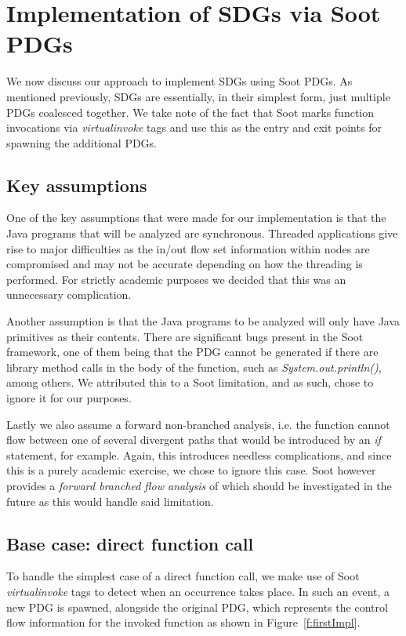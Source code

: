 \documentclass[authoryear,preprint]{sigplanconf}
\begin{document}
\section{Implementation of SDGs via Soot PDGs}

We now discuss our approach to implement SDGs using Soot PDGs. As mentioned previously, SDGs are essentially, in their simplest form, just multiple PDGs coalesced together. We take note of the fact that Soot marks function invocations via \textit{virtualinvoke} tags and use this as the entry and exit points for spawning the additional PDGs.

\subsection{Key assumptions}

One of the key assumptions that were made for our implementation is that the Java programs that will be analyzed are synchronous. Threaded applications give rise to major difficulties as the in/out flow set information within nodes are compromised and may not be accurate depending on how the threading is performed. For strictly academic purposes we decided that this was an unnecessary complication.

Another assumption is that the Java programs to be analyzed will only have Java primitives as their contents. There are significant bugs present in the Soot framework, one of them being that the PDG cannot be generated if there are library method calls in the body of the function, such as \textit{System.out.println()}, among others. We attributed this to a Soot limitation, and as such, chose to ignore it for our purposes.

Lastly we also assume a forward non-branched analysis, i.e. the function cannot flow between one of several divergent paths that would be introduced by an \textit{if} statement, for example. Again, this introduces needless complications, and since this is a purely academic exercise, we chose to ignore this case. Soot however provides a \textit{forward branched flow analysis} of which should be investigated in the future as this would handle said limitation.

\subsection{Base case: direct function call}

To handle the simplest case of a direct function call, we make use of Soot \textit{virtualinvoke} tags to detect when an occurrence takes place. In such an event, a new PDG is spawned, alongside the original PDG, which represents the control flow information for the invoked function as shown in Figure~\ref{f:firstImpl}.
\end{document}
